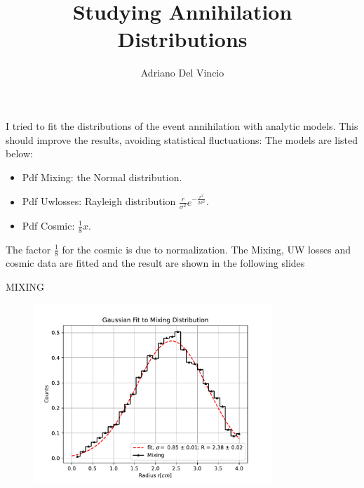 \documentclass[10pt]{beamer}
\author{Adriano Del Vincio}
\title{Studying Annihilation Distributions}
\begin{document}
\begin{frame}
\titlepage
\end{frame}


\begin{frame}{}

I tried to fit the distributions of the event annihilation with analytic models. This should improve the results, avoiding statistical fluctuations:
The models are listed below:
\begin{itemize}
\item Pdf Mixing: the Normal distribution.
\item Pdf Uwlosses: Rayleigh distribution $\frac{r}{\sigma^{2}} e^{-\frac{r^{2}}{2 \sigma^{2}}}$.
\item Pdf Cosmic: $\frac{1}{8} x$.
\end{itemize}

The factor $\frac{1}{8}$ for the cosmic is due to normalization. The Mixing, UW losses and cosmic data are fitted and the result are shown in the following slides 
\end{frame}

\begin{frame}{MIXING}

\begin{figure}
\includegraphics[width = 0.8\textwidth]{GaussianFitMixing.pdf}
\end{figure}

\end{frame}
\end{document}
